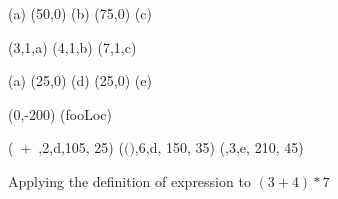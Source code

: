 





\begin {figure}

\Draw


\MarkLoc(a)
\Move(50,0)
\MarkLoc(b)
\Move(75,0)
\MarkLoc(c)

\boxItNoRulesDefault(3,1,a)
\boxItNoRulesDefault(4,1,b)
\boxItNoRulesDefault(7,1,c)

\MoveToLoc(a)
\Move(25,0)
\MarkLoc(d)
\Move(25,0)
\MarkLoc(e)

\Move(0,-200)
\MarkLoc(fooLoc)


\boxItNoRules(~$  +  $~,2,d,105, 25)
\boxItNoRules($($\hspace{0.8in}\hfill\hspace{0.8in}$)$,6,d, 150, 35)
\boxItNoRules(\hspace{135pt}\hfill*\hspace{20pt},3,e, 210, 45)

\EndDraw


\caption {Applying the definition of 
expression to $(3+4)*7$ }
\label {fig:exprsBoxedNoRules}

\end {figure}


